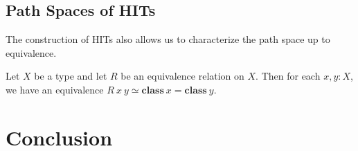 \documentclass[9pt]{entcs}
\newcommand{\constructor}[1]{\mathbf{#1}}
\newcommand{\0}{\textbf{0}} %
\newcommand{\1}{\textbf{1}} %
\newcommand{\weq}{\simeq} %
\newcommand{\classof}{\constructor{class}} %
\begin{document}
\subsection{Path Spaces of HITs}
The construction of HITs also allows us to characterize the path space up to equivalence.

\begin{proposition}
Let $X$ be a type and let $R$ be an equivalence relation on $X$.
Then for each $x, y : X$, we have an equivalence $R \> x \> y \weq \classof \> x = \classof \> y$.
\end{proposition}

\section{Conclusion}
\label{sec:conclusion}

\cite{AhrensKS15}
\cite{AhrensL19}
\cite{mac2013categories}
\end{document}
